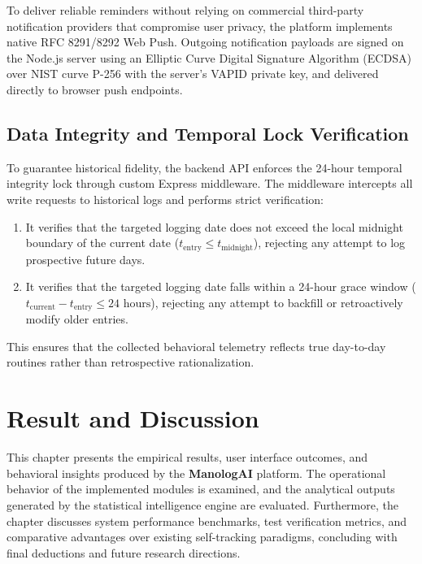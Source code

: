 To deliver reliable reminders without relying on commercial third-party notification providers that compromise user privacy, the platform implements native RFC 8291/8292 Web Push. Outgoing notification payloads are signed on the Node.js server using an Elliptic Curve Digital Signature Algorithm (ECDSA) over NIST curve P-256 with the server's VAPID private key, and delivered directly to browser push endpoints.

\section{Data Integrity and Temporal Lock Verification}

To guarantee historical fidelity, the backend API enforces the 24-hour temporal integrity lock through custom Express middleware. The middleware intercepts all write requests to historical logs and performs strict verification:
\begin{enumerate}
  \item It verifies that the targeted logging date does not exceed the local midnight boundary of the current date ($t_{\text{entry}} \le t_{\text{midnight}}$), rejecting any attempt to log prospective future days.
  \item It verifies that the targeted logging date falls within a 24-hour grace window ($t_{\text{current}} - t_{\text{entry}} \le 24\text{ hours}$), rejecting any attempt to backfill or retroactively modify older entries.
\end{enumerate}
This ensures that the collected behavioral telemetry reflects true day-to-day routines rather than retrospective rationalization.


\chapter{Result and Discussion}
\label{Chapter7}

This chapter presents the empirical results, user interface outcomes, and behavioral insights produced by the \textbf{ManologAI} platform. The operational behavior of the implemented modules is examined, and the analytical outputs generated by the statistical intelligence engine are evaluated. Furthermore, the chapter discusses system performance benchmarks, test verification metrics, and comparative advantages over existing self-tracking paradigms, concluding with final deductions and future research directions.


